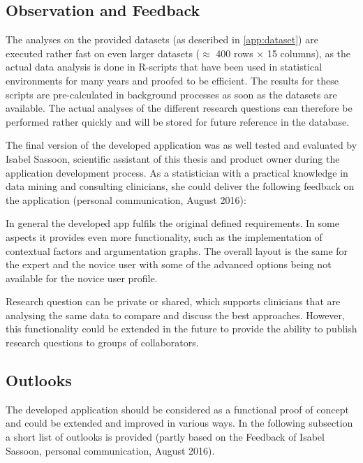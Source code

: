 \subsection{Observation and Feedback}
\sloppy

The analyses on the provided datasets (as described in \autoref{app:dataset}) are executed rather fast on even larger datasets ($\approx$ 400 rows $\times$ 15 columns), as the actual data analysis is done in \gls{R}-scripts that have been used in statistical environments for many years and proofed to be efficient. The results for these scripts are pre-calculated in background processes as soon as the datasets are available. The actual analyses of the different research questions can therefore be performed rather quickly and will be stored for future reference in the database.

The final version of the developed application was as well tested and evaluated by Isabel Sassoon, scientific assistant of this thesis and product owner during the application development process. As a statistician with a practical knowledge in data mining and consulting clinicians, she could deliver the following feedback on the application (personal communication, August 2016):

In general the developed app fulfils the original defined requirements. In some aspects it provides even more functionality, such as the implementation of contextual factors and argumentation graphs. The overall layout is the same for the expert and the novice user with some of the advanced options being not available for the novice user profile.

Research question can be private or shared, which supports clinicians that are analysing the same data to compare and discuss the best approaches. However, this functionality could be extended in the future to provide the ability to publish research questions to groups of collaborators.


\subsection{Outlooks}
\label{sub:outlooks}

The developed application should be considered as a functional proof of concept and could be extended and improved in various ways. In the following subsection a short list of outlooks is provided (partly based on the Feedback of Isabel Sassoon, personal communication, August 2016).

